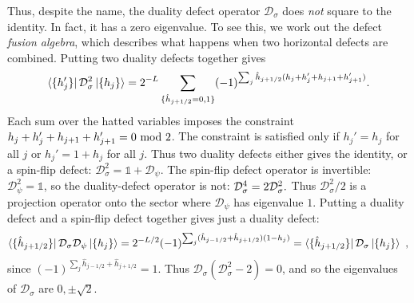 \documentclass[11pt]{article}
\newcommand{\D}{{\mathcal{D}}}
\numberwithin{equation}{section}		%
\begin{document}
Thus, despite the name, the duality defect operator $\mathcal{D}_\sigma$ does {\em not} square to the identity. In fact, it has a zero eigenvalue. To see this, we work out the defect {\em fusion algebra}, which describes what happens when two horizontal defects are combined. 
Putting two duality defects together gives
\begin{align}
\bra{\{ h_{j}' \}} \mathcal{D}_\sigma^2   \ket{\{ h_j \}} = 2^{-L}\sum_{\{\hat{h}_{j+1/2}=0,1\}} (-1)^{\sum_j \hat{h}_{j+1/2}(h_j+h_j' +h_{j+1}+h_{j+1}')}.
\end{align}
Each sum over the hatted variables imposes the constraint $h_j+h_j' +h_{j+1}+h_{j+1}' =0 \ {\rm mod}\ 2$. The constraint is satisfied only if $h_j' = h_j$ for all $j$ or $h_j' = 1+h_j$ for all $j$. Thus two duality defects either gives the identity, or a spin-flip defect:
$\D_\sigma^2=\mathds{1}+\D_\psi$.
The spin-flip defect operator is invertible: $\D_\psi^2=\mathds{1}$, so the duality-defect operator is not: ${\cal D}_\sigma^4=2{\cal D}_\sigma^2.$ Thus $\mathcal{D}_\sigma^2/2$ is a projection operator onto the sector where $\D_\psi$ has eigenvalue $1$. 
Putting a duality defect and a spin-flip defect together gives just a duality defect:
\begin{align}
\bra{\{ \hat{h}_{j+1/2} \}} \mathcal{D}_\sigma \mathcal{D}_{\psi}  \ket{\{ h_j \}}= 2^{-L/2}(-1)^{\sum_j (\hat{h}_{j-1/2 }+\hat{h}_{j+1/2})(1-h_j)} = \bra{ \{ \hat{h}_{j+1/2} \} } \mathcal{D}_\sigma   \ket{ \{ h_j \}} \ ,
\end{align}
since $(-1)^{\sum_j \hat{h}_{j-1/2}+\hat{h}_{j+1/2}}=1$. 
Thus $\mathcal{D}_\sigma(\mathcal{D}_{\sigma}^2-2)=0$, and so the eigenvalues of $\D_\sigma$ are $0,\pm\sqrt{2}$.
\end{document}
